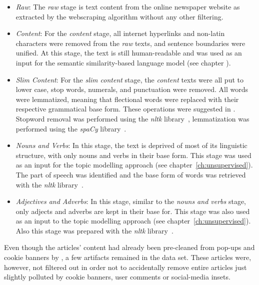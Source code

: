 \begin{itemize}
    \item \textit{Raw}: The \textit{raw} stage is text content from the online newspaper website as extracted by the webscraping algorithm without any other filtering.
    \item \textit{Content}: For the \textit{content} stage, all internet hyperlinks and non-latin characters were removed from the \textit{raw} texts, and sentence boundaries were unified. At this stage, the text is still human-readable and was used as an input for the semantic similarity-based language model (see chapter ).
    \item \textit{Slim Content}: For the \textit{slim content} stage, the \textit{content} texts were all put to lower case, stop words, numerals, and punctuation were removed. All words were lemmatized, meaning that flectional words were replaced with their respective grammatical base form. These operations were suggested in \textcite[p. 254]{vajjala_practical_2020}. Stopword removal was performed using the \textit{nltk} library~\autocite{bird_natural_2019}, lemmatization was performed using the \textit{spaCy} library~\autocite{spacy_spacy_nodate}.
    \item \textit{Nouns and Verbs}: In this stage, the text is deprived of most of its linguistic structure, with only nouns and verbs in their base form. This stage was used as an input for the topic modelling approach (see chapter~\ref{ch:unsupervised}). The part of speech was identified and the base form of words was retrieved with the \textit{nltk} library~\autocite{bird_natural_2019}.
    \item \textit{Adjectives and Adverbs}: In this stage, similar to the \textit{nouns and verbs} stage, only adjects and adverbs are kept in their base for. This stage was also used as an input to the topic modelling approach (see chapter~\ref{ch:unsupervised}). Also this stage was prepared with the \textit{nltk} library~\autocite{bird_natural_2019}.
\end{itemize}

Even though the articles' content had already been pre-cleaned from pop-ups and cookie banners by \textcite{fenske_using_2022}, a few artifacts remained in the data set. These articles were, however, not filtered out in order not to accidentally remove entire articles just slightly polluted by cookie banners, user comments or social-media insets.


